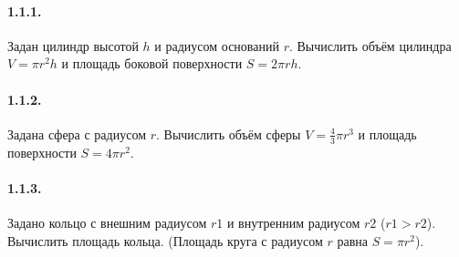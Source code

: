 



\paragraph*{1.1.1.} Задан цилиндр высотой $h$ и радиусом оснований $r$. Вычислить объём цилиндра $V = \pi r^2 h$ и площадь боковой поверхности $S = 2 \pi r h$.

\paragraph*{1.1.2.} Задана сфера с радиусом $r$. Вычислить объём сферы $V = \frac {4} {3} \pi r^3$ и площадь поверхности $S = 4 \pi r^2$.

\paragraph*{1.1.3.} Задано кольцо с внешним радиусом $r1$ и внутренним радиусом $r2$ ($r1 > r2$). Вычислить площадь кольца. (Площадь круга с радиусом $r$ равна $S = \pi r^2$).
